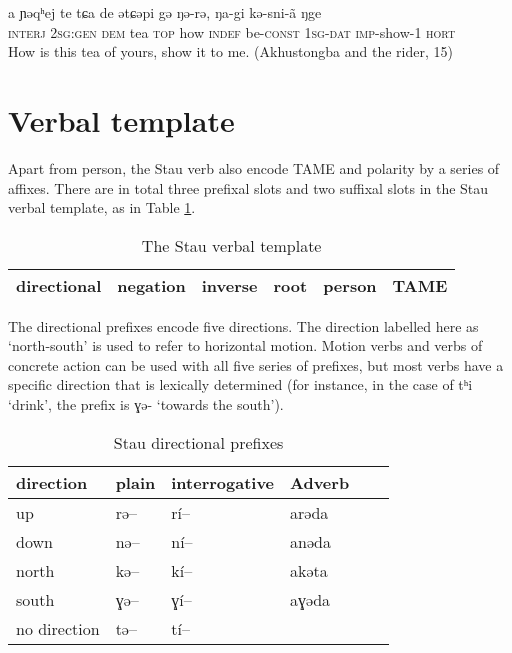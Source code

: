 \documentclass[oldfontcommands,oneside,a4paper,11pt]{article}
\newcommand{\ipa}[1]{{\phon #1}} %
\begin{document}
\begin{exe}
\ex \label{ex:kEsnaN}
\gll
	\ipa{a} 	\ipa{ɲəqʰej} 	\ipa{te} 	\ipa{tɕa} 	\ipa{de} 	\ipa{ətɕəpi} 	\ipa{gə} 	\ipa{ŋə-rə,} 	\ipa{ŋa-gi} 	\ipa{kə-sni-ã} 	\ipa{ŋge}  \\
	\textsc{interj} \textsc{2sg:gen} \textsc{dem} tea \textsc{top} how \textsc{indef} be-\textsc{const} \textsc{1sg-dat} \textsc{imp}-show-1 \textsc{hort} \\ 
	\glt How is this tea of yours, show it to me. (Akhustongba and the rider, 15)
\end{exe}

\section{Verbal template}
Apart from person, the Stau verb also encode TAME and polarity by a series of affixes. There are in total three prefixal slots and two suffixal slots in the Stau verbal template, as in Table \ref{tab:template}.

\begin{table}[h]
\caption{The Stau verbal template} \centering \label{tab:template}
\begin{tabular}{llllll}
\toprule
directional  &  	negation  &  	inverse  &  	root  &  	person  &  	TAME  \\
\bottomrule
\end{tabular}
\end{table}

The directional prefixes encode five directions. The direction labelled here as `north-south' is used to refer to   horizontal motion. Motion verbs and verbs of concrete action can be used with all five series of prefixes, but most verbs have a specific direction that is lexically determined (for instance, in the case of \ipa{tʰi} `drink', the prefix is \ipa{ɣə-} `towards the south').

\begin{table}[h]
\caption{Stau directional prefixes} \centering \label{tab:directional}
\begin{tabular}{llllll}
\toprule
direction   &  	plain  &  	interrogative    & Adverb 	   \\
\midrule
up & \ipa{rə--}& \ipa{rí--} & \ipa{arəda}\\
down & \ipa{nə--}& \ipa{ní--} & \ipa{anəda}\\
north & \ipa{kə--}& \ipa{kí--} & \ipa{akəta}\\
south & \ipa{ɣə--}& \ipa{ɣí--}& \ipa{aɣəda}\\
no direction & \ipa{tə--}& \ipa{tí--} \\
\bottomrule
\end{tabular}
\end{table}
\end{document}
